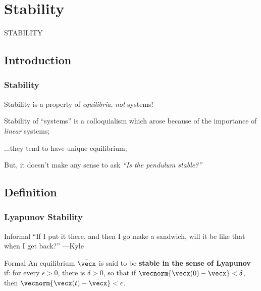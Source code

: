 \documentclass[12pt]{beamer}
\begin{document}
\section{Stability}


\begin{frame}
\vfill
\centering
{\Large STABILITY}
\vfill\null
\end{frame}



\subsection{Introduction}

\begin{frame}
\frametitle{Stability}

\begin{itemize}

\vitem Stability is a property of \emph{equilibria}, \emph{not} systems!

\vitem Stability of ``systems'' is a colloquialism which arose because of the importance of \emph{linear} systems;

\vitem ...they tend to have unique equilibrium;

\vitem But, it doesn't make any sense to ask \emph{``Is the pendulum stable?''}

\end{itemize}

\end{frame}



\subsection{Definition}

\begin{frame}
\frametitle{Lyapunov Stability}
\vfill
\begin{block}{Informal}
``If I put it there, and then I go make a sandwich, will it be like that when I get back?''
---Kyle
\end{block}

\vfill
\begin{block}{Formal}
An equilibrium $\bar\vecx$ is said to be \textbf{stable in the sense of Lyapunov} if:
for every $\epsilon > 0$, there is $\delta >0$, so that
if $\vecnorm{\vecx(0)-\bar\vecx} < \delta$, then
$\vecnorm{\vecx(t) - \bar\vecx} < \epsilon$. 
\end{block}

\vfill\null

\end{frame}
\end{document}
